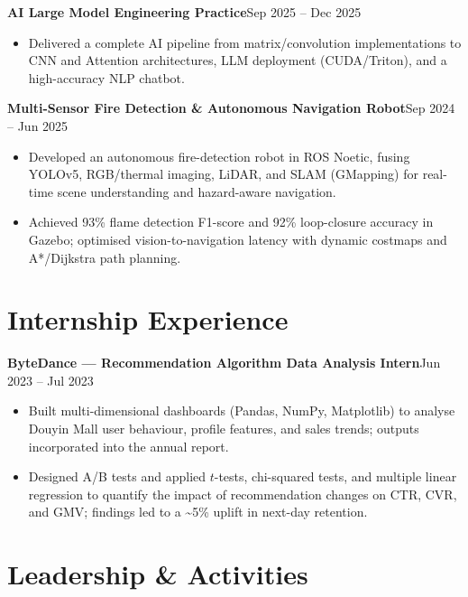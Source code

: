 \documentclass[a4paper,10pt]{article}
\newcommand{\entry}[2]{%
  \noindent\textbf{#1}\hfill#2\par%
}
\begin{document}
\vspace{3pt}
\entry{AI Large Model Engineering Practice}{Sep 2025 -- Dec 2025}
\begin{itemize}
  \item Delivered a complete AI pipeline from matrix/convolution implementations to CNN and Attention architectures, LLM deployment (CUDA/Triton), and a high-accuracy NLP chatbot.
\end{itemize}

\vspace{3pt}
\entry{Multi-Sensor Fire Detection \& Autonomous Navigation Robot}{Sep 2024 -- Jun 2025}
\begin{itemize}
  \item Developed an autonomous fire-detection robot in ROS Noetic, fusing YOLOv5, RGB/thermal imaging, LiDAR, and SLAM (GMapping) for real-time scene understanding and hazard-aware navigation.
  \item Achieved 93\% flame detection F1-score and 92\% loop-closure accuracy in Gazebo; optimised vision-to-navigation latency with dynamic costmaps and A*/Dijkstra path planning.
\end{itemize}

\section*{Internship Experience}

\entry{ByteDance --- Recommendation Algorithm Data Analysis Intern}{Jun 2023 -- Jul 2023}
\begin{itemize}
  \item Built multi-dimensional dashboards (Pandas, NumPy, Matplotlib) to analyse Douyin Mall user behaviour, profile features, and sales trends; outputs incorporated into the annual report.
  \item Designed A/B tests and applied $t$-tests, chi-squared tests, and multiple linear regression to quantify the impact of recommendation changes on CTR, CVR, and GMV; findings led to a \textasciitilde5\% uplift in next-day retention.
\end{itemize}

\section*{Leadership \& Activities}
\end{document}
